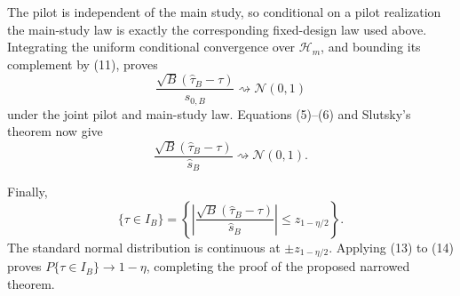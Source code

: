 The pilot is independent of the main study, so conditional on a pilot realization the main-study law is exactly the corresponding fixed-design law used above.  Integrating the uniform conditional convergence over \(\mathcal H_m\), and bounding its complement by (11), proves
\[
 \frac{\sqrt B(\widehat\tau_B-\tau)}{s_{0,B}}
 \rightsquigarrow\mathcal N(0,1)                            \tag{12}
\]
under the joint pilot and main-study law.  Equations (5)--(6) and Slutsky's theorem now give
\[
 \frac{\sqrt B(\widehat\tau_B-\tau)}{\widehat s_B}
 \rightsquigarrow\mathcal N(0,1).                           \tag{13}
\]

Finally,
\[
 \{\tau\in I_B\}
 =\left\{
 \left|\frac{\sqrt B(\widehat\tau_B-\tau)}{\widehat s_B}\right|
 \le z_{1-\eta/2}\right\}.                                 \tag{14}
\]
The standard normal distribution is continuous at \(\pm z_{1-\eta/2}\).  Applying (13) to (14) proves \(P\{\tau\in I_B\}\to1-\eta\), completing the proof of the proposed narrowed theorem.